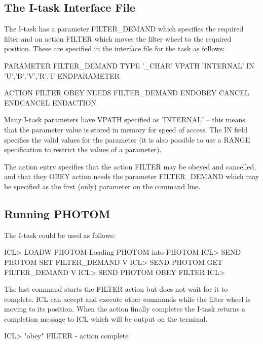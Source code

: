 \documentclass[twoside,11pt,nolof,chapters]{starlink}
\begin{document}
\subsection{The I-task Interface File}

The I-task has a parameter FILTER\_DEMAND which specifies the required filter
and an action FILTER which moves the filter wheel to the required position.
These are specified in the interface file for the task as follows:

\begin{terminalv}
    PARAMETER FILTER_DEMAND
      TYPE '_CHAR'
      VPATH 'INTERNAL'
      IN 'U','B','V','R','I'
    ENDPARAMETER

    ACTION FILTER
      OBEY
        NEEDS FILTER_DEMAND
      ENDOBEY
      CANCEL
      ENDCANCEL
    ENDACTION
\end{terminalv}

Many I-task parameters have VPATH specified as 'INTERNAL' --
this means that the parameter value is stored in memory for speed of access.
The IN field
specifies the valid values for the parameter (it is also possible to use
a RANGE specification to restrict the values of a parameter).

The action entry specifies that the action FILTER may be obeyed and
cancelled, and that they OBEY action needs the parameter FILTER\_DEMAND which
may be specified as the first (only) parameter on the command line.


\subsection{Running PHOTOM}

The I-task could be used as follows:

\begin{terminalv}
    ICL> LOADW PHOTOM
    Loading PHOTOM into PHOTOM
    ICL> SEND PHOTOM SET FILTER_DEMAND V
    ICL> SEND PHOTOM GET FILTER_DEMAND
    V
    ICL> SEND PHOTOM OBEY FILTER
    ICL>
\end{terminalv}

The last command starts the FILTER action but does not wait for it to complete.
ICL can accept and execute other commands while the filter wheel is moving
to its position. When the action finally completes the I-task returns a
completion message to ICL which will be output on the terminal.

\begin{terminalv}
    ICL>
    "obey" FILTER - action complete
\end{terminalv}
\end{document}
